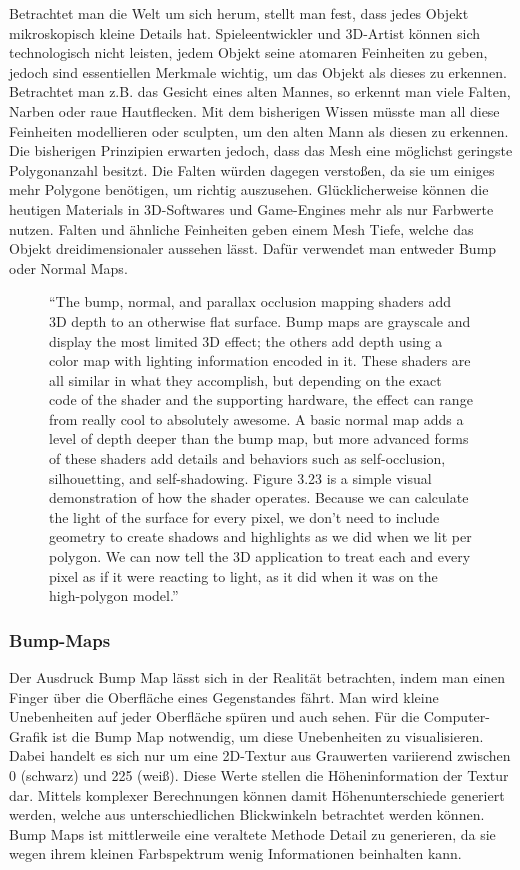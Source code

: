 Betrachtet man die Welt um sich herum, stellt man fest, dass jedes Objekt mikroskopisch kleine Details hat. Spieleentwickler und 3D-Artist können sich technologisch nicht leisten, jedem Objekt seine atomaren Feinheiten zu geben, jedoch sind essentiellen Merkmale wichtig, um das Objekt als dieses zu erkennen. Betrachtet man z.B. das Gesicht eines alten Mannes, so erkennt man viele Falten, Narben oder raue Hautflecken. Mit dem bisherigen Wissen müsste man all diese Feinheiten modellieren oder sculpten, um den alten Mann als diesen zu erkennen.\cite[3]{_highpoly_to_lowpoly} Die bisherigen Prinzipien erwarten jedoch, dass das Mesh eine möglichst geringste Polygonanzahl besitzt. Die Falten würden dagegen verstoßen, da sie um einiges mehr Polygone benötigen, um richtig auszusehen. Glücklicherweise können die heutigen Materials in 3D-Softwares und Game-Engines mehr als nur Farbwerte nutzen.
Falten und ähnliche Feinheiten geben einem Mesh Tiefe, welche das Objekt dreidimensionaler aussehen lässt. Dafür verwendet man entweder Bump oder Normal Maps.

\begin{figure}[H]
	\centering
"`The bump, normal, and parallax occlusion mapping shaders add 3D depth to an otherwise flat surface. Bump maps are grayscale and display the most limited 3D effect; the others add depth using a color map with lighting information encoded in it. These shaders are all similar in what they accomplish, but depending on the exact code of the shader and the supporting hardware, the effect can range from really cool to absolutely awesome. A basic normal map adds a level of depth deeper than the bump map, but more advanced forms of these shaders add details and behaviors such as self-occlusion, silhouetting, and self-shadowing. Figure 3.23 is a simple visual demonstration of how the shader operates. Because we can calculate the light of the surface for every pixel, we don’t need to include geometry to create shadows and highlights as we did when we lit per polygon. We can now tell the 3D application to treat each and every pixel as if it were reacting to light, as it did when it was on the high-polygon model."'
\cite[96]{_3DGameTextures}
\end{figure}


\subsubsection{Bump-Maps}
Der Ausdruck Bump Map lässt sich in der Realität betrachten, indem man einen Finger über die Oberfläche eines Gegenstandes fährt. Man wird kleine Unebenheiten auf jeder Oberfläche spüren und auch sehen. Für die Computer-Grafik ist die Bump Map notwendig, um diese Unebenheiten zu visualisieren. Dabei handelt es sich nur um eine 2D-Textur aus Grauwerten variierend zwischen 0 (schwarz) und 225 (weiß). Diese Werte stellen die Höheninformation der Textur dar. Mittels komplexer Berechnungen können damit Höhenunterschiede generiert werden, welche aus unterschiedlichen Blickwinkeln betrachtet werden können. Bump Maps ist mittlerweile eine veraltete Methode Detail zu generieren, da sie wegen ihrem kleinen Farbspektrum wenig Informationen beinhalten kann.\cite[86]{_3d_game_textures}

